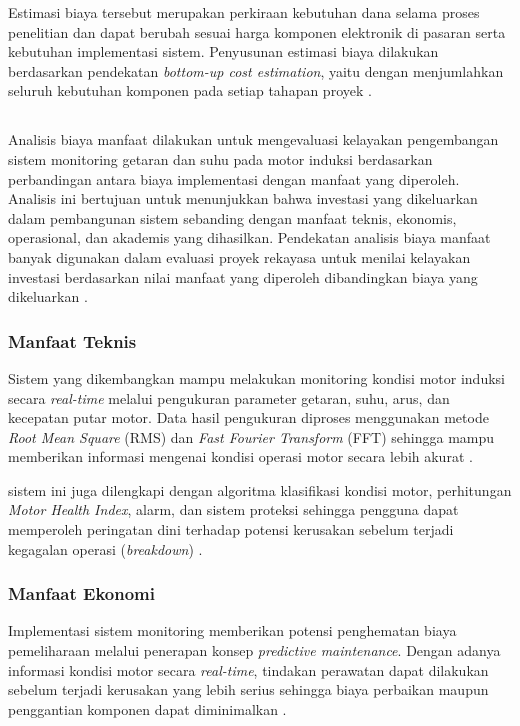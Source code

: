 \documentclass{elsinta}
\begin{document}
Estimasi biaya tersebut merupakan perkiraan kebutuhan dana selama proses penelitian dan dapat berubah sesuai harga komponen elektronik di pasaran serta kebutuhan implementasi sistem. Penyusunan estimasi biaya dilakukan berdasarkan pendekatan \textit{bottom-up cost estimation}, yaitu dengan menjumlahkan seluruh kebutuhan komponen pada setiap tahapan proyek \cite{PMBOK}.

\subsection{\CostBenefitTitle}
Analisis biaya manfaat dilakukan untuk mengevaluasi kelayakan pengembangan sistem monitoring getaran dan suhu pada motor induksi berdasarkan perbandingan antara biaya implementasi dengan manfaat yang diperoleh. Analisis ini bertujuan untuk menunjukkan bahwa investasi yang dikeluarkan dalam pembangunan sistem sebanding dengan manfaat teknis, ekonomis, operasional, dan akademis yang dihasilkan. Pendekatan analisis biaya manfaat banyak digunakan dalam evaluasi proyek rekayasa untuk menilai kelayakan investasi berdasarkan nilai manfaat yang diperoleh dibandingkan biaya yang dikeluarkan \cite{boardman2018}.

\subsubsection{Manfaat Teknis}

Sistem yang dikembangkan mampu melakukan monitoring kondisi motor induksi secara \textit{real-time} melalui pengukuran parameter getaran, suhu, arus, dan kecepatan putar motor. Data hasil pengukuran diproses menggunakan metode \textit{Root Mean Square} (RMS) dan \textit{Fast Fourier Transform} (FFT) sehingga mampu memberikan informasi mengenai kondisi operasi motor secara lebih akurat \cite{randall2011,oppenheim2010}.

sistem ini juga dilengkapi dengan algoritma klasifikasi kondisi motor, perhitungan \textit{Motor Health Index}, alarm, dan sistem proteksi sehingga pengguna dapat memperoleh peringatan dini terhadap potensi kerusakan sebelum terjadi kegagalan operasi (\textit{breakdown}) \cite{jardine2006}.
\subsubsection{Manfaat Ekonomi}

Implementasi sistem monitoring memberikan potensi penghematan biaya pemeliharaan melalui penerapan konsep \textit{predictive maintenance}. Dengan adanya informasi kondisi motor secara \textit{real-time}, tindakan perawatan dapat dilakukan sebelum terjadi kerusakan yang lebih serius sehingga biaya perbaikan maupun penggantian komponen dapat diminimalkan \cite{jardine2006}.
\end{document}
